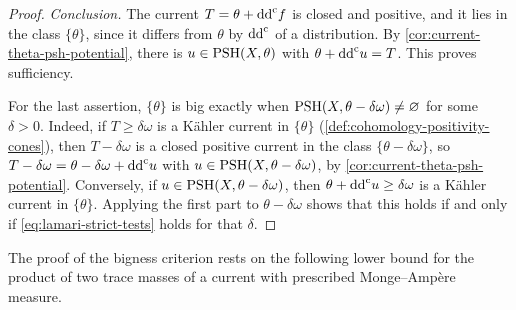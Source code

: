 \begin{proof}
\emph{Conclusion.} The current $T=\theta+\mathrm{dd}^{\mathrm{c}} f$ is closed and positive, and it lies in the class $\{\theta\}$, since it differs from $\theta$ by $\mathrm{dd}^{\mathrm{c}}$ of a distribution. By \cref{cor:current-theta-psh-potential}, there is $u\in\mathrm{PSH}(X,\theta)$ with $\theta+\mathrm{dd}^{\mathrm{c}} u=T$. This proves sufficiency.

For the last assertion, $\{\theta\}$ is big exactly when $\mathrm{PSH}(X,\theta-\delta\omega)\neq\varnothing$ for some $\delta>0$. Indeed, if $T\geq\delta\omega$ is a K\"ahler current in $\{\theta\}$ (\cref{def:cohomology-positivity-cones}), then $T-\delta\omega$ is a closed positive current in the class $\{\theta-\delta\omega\}$, so $T-\delta\omega=\theta-\delta\omega+\mathrm{dd}^{\mathrm{c}} u$ with $u\in\mathrm{PSH}(X,\theta-\delta\omega)$, by \cref{cor:current-theta-psh-potential}. Conversely, if $u\in\mathrm{PSH}(X,\theta-\delta\omega)$, then $\theta+\mathrm{dd}^{\mathrm{c}} u\geq\delta\omega$ is a K\"ahler current in $\{\theta\}$. Applying the first part to $\theta-\delta\omega$ shows that this holds if and only if \eqref{eq:lamari-strict-tests} holds for that $\delta$.
\end{proof}

The proof of the bigness criterion rests on the following lower bound for the product of two trace masses of a current with prescribed Monge--Amp\`ere measure.

